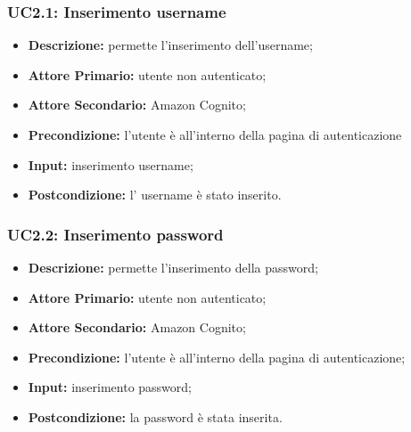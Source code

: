 \subsubsection{UC2.1: Inserimento username}
\label{sec:UC2.1}
\begin{itemize}
    \item \textbf{Descrizione:} permette l'inserimento dell'username;
    \item \textbf{Attore Primario:} utente non autenticato;
    \item \textbf{Attore Secondario:} Amazon Cognito;
    \item \textbf{Precondizione:} l'utente è all'interno della pagina di autenticazione
    \item \textbf{Input:} inserimento username;
    \item \textbf{Postcondizione:} l' username è stato inserito.
\end{itemize}
\subsubsection{UC2.2: Inserimento password}
\label{sec:UC2.2}
\begin{itemize}
    \item \textbf{Descrizione:} permette l'inserimento della password;
    \item \textbf{Attore Primario:} utente non autenticato;
    \item \textbf{Attore Secondario:} Amazon Cognito;
    \item \textbf{Precondizione:} l'utente è all'interno della pagina di autenticazione;
    \item \textbf{Input:} inserimento password;
    \item \textbf{Postcondizione:} la password è stata inserita.
\end{itemize}

